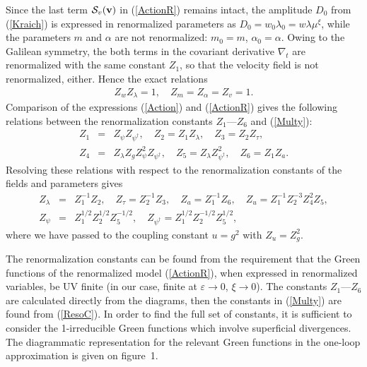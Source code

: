 \documentclass[12pt]{iopart}
\begin{document}
Since the last term ${\cal S}_{v}({\bf v})$ in (\ref{ActionR}) remains
intact, the amplitude $D_{0}$ from (\ref{Kraich}) is
expressed in renormalized parameters as $D_{0} = w_{0} \lambda_{0}
= w\lambda \mu^{\xi}$, while the parameters $m$ and $\alpha$ are
not renormalized: $m_{0} = m$, $\alpha_{0} = \alpha$. Owing to the
Galilean symmetry, the both terms in the covariant derivative
$\nabla_{t}$ are renormalized with the same constant $Z_{1}$, so
that the velocity field is not renormalized, either. Hence the exact
relations
\begin{eqnarray}
Z_{w}Z_{\lambda} =1, \quad Z_{m}= Z_{\alpha} = Z_{v} =1.
\label{RenD}
\end{eqnarray}
Comparison of the expressions (\ref{Action}) and (\ref{ActionR})
gives the following relations between the renormalization
constants $Z_{1}$---$Z_{6}$ and (\ref{Multy}):
\begin{eqnarray}
Z_{1} &=& Z_{\psi} Z_{\psi^{\dagger}}, \quad Z_{2} =
Z_{1}Z_{\lambda}, \quad Z_{3} = Z_{2} Z_{\tau},
 \nonumber \\
Z_{4} &=& Z_{\lambda}Z_{g} Z_{\psi}^{2} Z_{\psi^{\dagger}}, \quad
Z_{5} = Z_{\lambda} Z_{\psi^{\dagger}}^{2}, \quad
Z_{6} = Z_{1} Z_{a}.
\label{ZZ}
\end{eqnarray}
Resolving these relations with respect to the
renormalization constants of the fields and parameters gives
\begin{eqnarray}
Z_{\lambda} &=& Z_{1}^{-1} Z_{2}, \quad
Z_{\tau} = Z_{2}^{-1} Z_{3}, \quad
Z_{a} = Z_{1}^{-1} Z_{6}, \quad
Z_{u} = Z_{1}^{-1} Z_{2}^{-3} Z_{4}^{2} Z_{5},
 \nonumber \\
Z_{\psi} &=&
Z_{1}^{1/2}Z_{2}^{1/2}Z_{5}^{-1/2}, \quad
Z_{\psi^{\dag}} = Z_{1}^{1/2}Z_{2}^{-1/2}Z_{5}^{1/2},
\label{ResoC}
\end{eqnarray}
where we have passed to the coupling constant $u=g^{2}$
with $Z_{u}=Z_{g}^{2}$.


The renormalization constants can be found from the requirement
that the Green functions of the renormalized model
(\ref{ActionR}), when expressed in renormalized variables, be UV
finite (in our case, finite at $\varepsilon\to0$, $\xi\to0$).
The constants $Z_{1}$---$Z_{6}$ are calculated directly from the
diagrams, then the constants in (\ref{Multy}) are found from
(\ref{ResoC}). In order to find the full set of constants, it is
sufficient to consider the 1-irreducible Green functions which
involve superficial divergences. The diagrammatic representation for
the relevant Green functions in the one-loop approximation is given
on figure~1.
\end{document}
